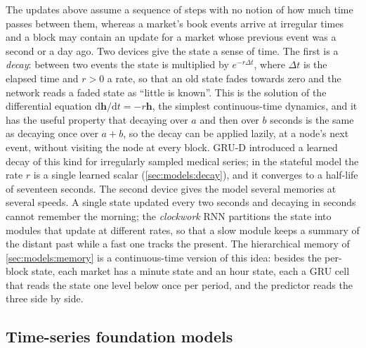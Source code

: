 The updates above assume a sequence of steps with no notion of how much time passes between
them, whereas a market's book events arrive at irregular times and a block may contain an
update for a market whose previous event was a second or a day ago.  Two devices give the
state a sense of time.  The first is a \emph{decay}: between two events the state is
multiplied by $e^{-r \Delta t}$, where $\Delta t$ is the elapsed time and $r > 0$ a rate,
so that an old state fades towards zero and the network reads a faded state as ``little is
known''.  This is the solution of the differential equation $\mathrm{d}\mathbf{h} /
\mathrm{d}t = -r \mathbf{h}$, the simplest continuous-time dynamics, and it has the useful
property that decaying over $a$ and then over $b$ seconds is the same as decaying once over
$a + b$, so the decay can be applied lazily, at a node's next event, without visiting the
node at every block.  GRU-D \cite{che2018grud} introduced a learned decay of this kind for
irregularly sampled medical series; in the stateful model the rate $r$ is a single learned
scalar (\cref{sec:models:decay}), and it converges to a half-life of seventeen seconds.
The second device gives the model several memories at several speeds.  A single state
updated every two seconds and decaying in seconds cannot remember the morning; the
\emph{clockwork} RNN \cite{koutnik2014clockwork} partitions the state into modules that
update at different rates, so that a slow module keeps a summary of the distant past while
a fast one tracks the present.  The hierarchical memory of \cref{sec:models:memory} is a
continuous-time version of this idea: besides the per-block state, each market has a
minute state and an hour state, each a GRU cell that reads the state one level below once
per period, and the predictor reads the three side by side.

\subsection{Time-series foundation models}
\label{sec:bg:tsfm}

